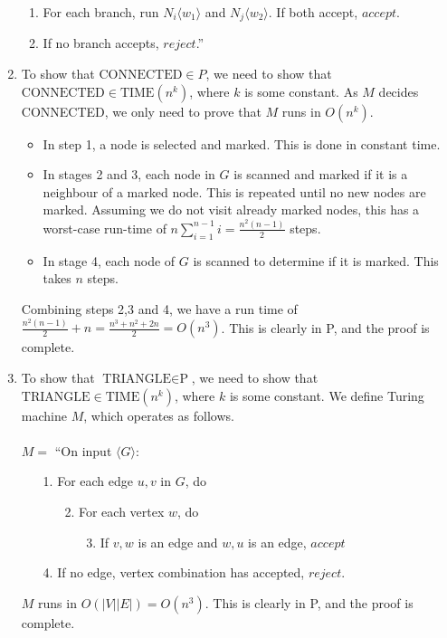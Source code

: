 \documentclass[11pt]{article}
\renewcommand{\indent}{\hspace{1em}}
\begin{document}
\begin{enumerate}[7.1]
\begin{enumerate}[\indent1.]
      \item \indent For each branch, run $N_i\langle w_1 \rangle$ and $N_j\langle w_2 \rangle$. If both accept, $accept$.
      \item If no branch accepts, $reject$.''
    \end{enumerate}
  \item To show that $\text{CONNECTED} \in P$, we need to show that $\text{CONNECTED} \in \text{TIME}(n^k)$, where $k$ is some constant. As $M$ decides CONNECTED, we only need to prove that $M$ runs in $O(n^k)$.
    \begin{itemize}
      \item In step 1, a node is selected and marked. This is done in constant time.
      \item In stages 2 and 3, each node in $G$ is scanned and marked if it is a neighbour of a marked node. This is repeated until no new nodes are marked. Assuming we do not visit already marked nodes, this has a worst-case run-time of $n \sum_{i=1}^{n-1} i = \frac{n^2(n - 1)}{2}$ steps.
      \item In stage 4, each node of $G$ is scanned to determine if it is marked. This takes $n$ steps.
    \end{itemize}
    Combining steps 2,3 and 4, we have a run time of $\frac{n^2(n-1)}{2} + n = \frac{n^3 + n^2 + 2n}{2} = O(n^3)$. This is clearly in P, and the proof is complete.
  \item To show that $\text{TRIANGLE} \in \text{P}$, we need to show that $\text{TRIANGLE} \in \text{TIME}(n^k)$, where $k$ is some constant. We define Turing machine $M$, which operates as follows.\\\\
    $M =$ ``On input $\langle G \rangle$:
    \begin{enumerate}
      \item[1.] For each edge $u, v$ in $G$, do
        \begin{enumerate}
        \item[2.] For each vertex $w$, do
          \begin{enumerate}
            \item[3.] If $v, w$ is an edge and $w, u$ is an edge, $accept$
          \end{enumerate}
        \end{enumerate}
      \item[4.] If no edge, vertex combination has accepted, $reject$.
    \end{enumerate}
    $M$ runs in $O(|V||E|) = O(n^3)$. This is clearly in P, and the proof is complete.
\end{enumerate}
\end{document}
